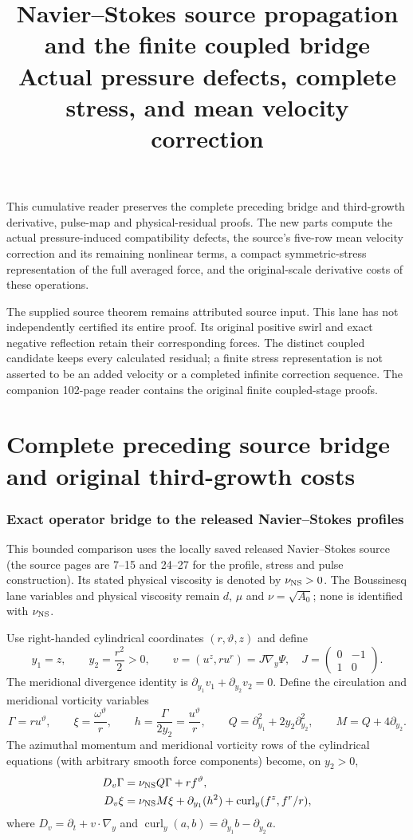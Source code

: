 \documentclass[11pt]{article}
\title{Navier--Stokes source propagation and the finite coupled bridge\\
Actual pressure defects, complete stress, and mean velocity correction}
\author{}\date{}
\begin{document}
\maketitle
This cumulative reader preserves the complete preceding bridge and
third-growth derivative, pulse-map and physical-residual proofs.
The new parts compute the actual pressure-induced compatibility defects,
the source's five-row mean velocity correction and its remaining nonlinear
terms, a compact symmetric-stress representation of the full averaged
force, and the original-scale derivative costs of these operations.

The supplied source theorem remains attributed source input. This lane
has not independently certified its entire proof. Its original positive
swirl and exact negative reflection retain their corresponding forces.
The distinct coupled candidate keeps every calculated residual; a finite
stress representation is not asserted to be an added velocity or a
completed infinite correction sequence. The companion 102-page reader
contains the original finite coupled-stage proofs.
\tableofcontents\clearpage
\part{Complete preceding source bridge and original third-growth costs}
\section{Exact operator bridge to the released Navier--Stokes profiles}
\label{nsbridge:nsb:operator}

This bounded comparison uses the locally saved released Navier--Stokes source
(the source pages are 7--15 and 24--27 for the profile, stress and pulse
construction). Its stated physical viscosity is denoted by $\nu_{\rm NS}>0$.
The Boussinesq lane variables and physical viscosity remain $d$, $\mu$ and
$\nu=\sqrt{A_0}$; none is identified with $\nu_{\rm NS}$.

Use right-handed cylindrical coordinates $(r,\vartheta,z)$ and define
\[
 y_1=z,\qquad y_2=\frac{r^2}{2}>0,\qquad
 v=(u^z,ru^r)=J\nabla_y\Psi,
 \quad J=\begin{pmatrix}0&-1\\1&0\end{pmatrix}.
\]
The meridional divergence identity is
$\partial_{y_1}v_1+\partial_{y_2}v_2=0$. Define the circulation and
meridional vorticity variables
\[
 \Gamma=ru^\vartheta,
 \qquad \xi=\frac{\omega^\vartheta}{r},
 \qquad h=\frac{\Gamma}{2y_2}=\frac{u^\vartheta}{r},
 \qquad Q=\partial_{y_1}^2+2y_2\partial_{y_2}^2,
 \qquad M=Q+4\partial_{y_2}.
\]
The azimuthal momentum and meridional vorticity rows of the cylindrical
equations (with arbitrary smooth force components) become, on $y_2>0$,
\begin{align}
 D_v\Gamma&=\nu_{\rm NS}Q\Gamma+r f^\vartheta,
 \label{nsbridge:nsb:Gamma}\\
 D_v\xi&=\nu_{\rm NS}M\xi+\partial_{y_1}(h^2)
       +\operatorname{curl}_y(f^z,f^r/r),
 \label{nsbridge:nsb:xi}
\end{align}
where $D_v=\partial_t+v\cdot\nabla_y$ and
$\operatorname{curl}_y(a,b)=\partial_{y_1}b-\partial_{y_2}a$.
\end{document}
